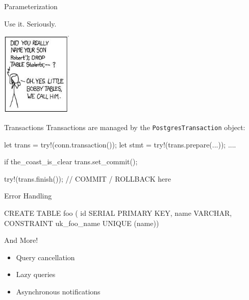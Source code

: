 \documentclass{beamer}
\begin{document}
\begin{frame}[fragile]{Parameterization}
    \begin{center}
        Use it. Seriously.

        \vspace{.75cm}

        \href{http://xkcd.com/327/}{\includegraphics[height=4cm]{bobby_tables.jpg}}
    \end{center}
\end{frame}

\begin{frame}[fragile]{Transactions}
    Transactions are managed by the \verb!PostgresTransaction! object:
    \begin{rustcode}
let trans = try!(conn.transaction());
let stmt = try!(trans.prepare(...));
....

if the_coast_is_clear {
    trans.set_commit();
}

try!(trans.finish()); // COMMIT / ROLLBACK here
    \end{rustcode}
\end{frame}

\begin{frame}[fragile]{Error Handling}
    \begin{sqlcode}
CREATE TABLE foo (
    id SERIAL PRIMARY KEY,
    name VARCHAR,
    CONSTRAINT uk_foo_name UNIQUE (name))
    \end{sqlcode}
\end{frame}

\begin{frame}{And More!}
    \begin{itemize}
        \item Query cancellation
        \item Lazy queries
        \item Asynchronous notifications
    \end{itemize}
\end{frame}
\end{document}
